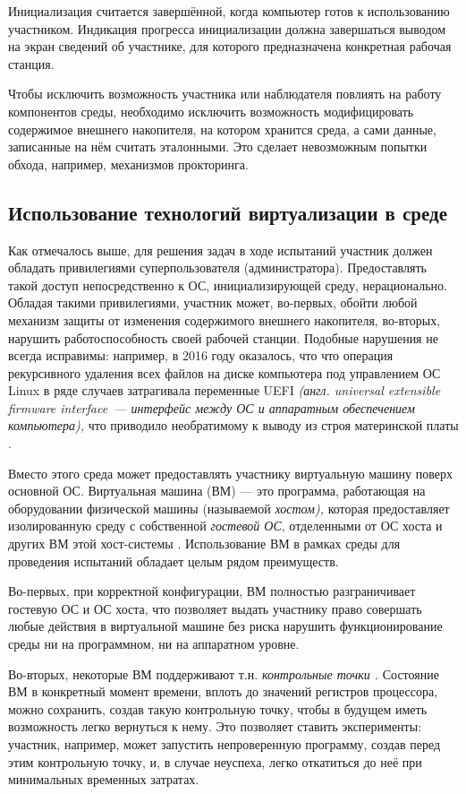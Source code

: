 Инициализация считается завершённой, когда компьютер готов к использованию участником. Индикация прогресса инициализации должна завершаться выводом на экран сведений об участнике, для которого предназначена конкретная рабочая станция.

Чтобы исключить возможность участника или наблюдателя повлиять на работу компонентов среды, необходимо исключить возможность модифицировать содержимое внешнего накопителя, на котором хранится среда, а сами данные, записанные на нём считать эталонными. Это сделает невозможным попытки обхода, например, механизмов прокторинга.



\subsection{Использование технологий виртуализации в среде}

Как отмечалось выше, для решения задач в ходе испытаний участник должен обладать привилегиями суперпользователя (администратора). Предоставлять такой доступ непосредственно к ОС, инициализирующей среду, нерационально. Обладая такими привилегиями, участник может, во-первых, обойти любой механизм защиты от изменения содержимого внешнего накопителя, во-вторых, нарушить работоспособность своей рабочей станции. Подобные нарушения не всегда исправимы: например, в 2016 году оказалось, что что операция рекурсивного удаления всех файлов на диске компьютера под управлением ОС Linux в ряде случаев затрагивала переменные UEFI \textit{(англ. universal extensible firmware interface~--- интерфейс между ОС и аппаратным обеспечением компьютера),} что приводило необратимому к выводу из строя материнской платы \cite{EFIrm}.

Вместо этого среда может предоставлять участнику виртуальную машину поверх основной ОС. Виртуальная машина (ВМ) — это программа, работающая на оборудовании физической машины (называемой \textit{хостом),} которая предоставляет изолированную среду с собственной \textit{гостевой ОС}, отделенными от ОС хоста и других ВМ этой хост-системы \cite{HPEVM}.
Использование ВМ в рамках среды для проведения испытаний обладает целым рядом преимуществ.

Во-первых, при корректной конфигурации, ВМ полностью разграничивает гостевую ОС и ОС хоста, что позволяет выдать участнику право совершать любые действия в виртуальной машине без риска нарушить функционирование среды ни на программном, ни на аппаратном уровне.

Во-вторых, некоторые ВМ поддерживают т.н. \textit{контрольные точки \cite{VMrollback}.} Состояние ВМ в конкретный момент времени, вплоть до значений регистров процессора, можно сохранить, создав такую контрольную точку, чтобы в будущем иметь возможность легко вернуться к нему. Это позволяет ставить эксперименты: участник, например, может запустить непроверенную программу, создав перед этим контрольную точку, и, в случае неуспеха, легко откатиться до неё при минимальных временных затратах.

